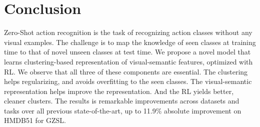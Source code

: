 \documentclass[runningheads]{llncs}
\begin{document}
\section{Conclusion}

Zero-Shot action recognition is the task of recognizing action classes without any visual examples. The challenge is to map the knowledge of seen classes at training time to that of novel unseen classes at test time. We propose a novel model that learns clustering-based representation of visual-semantic features, optimized with RL. We observe that all three of these components are essential. The clustering helps regularizing, and avoids overfitting to the seen classes. The visual-semantic representation helps improve the representation. And the RL yields better, cleaner clusters. 
The results is remarkable improvements across datasets and tasks over all previous state-of-the-art, up to 11.9\% absolute improvement on HMDB51 for GZSL. 



\clearpage



\end{document}
